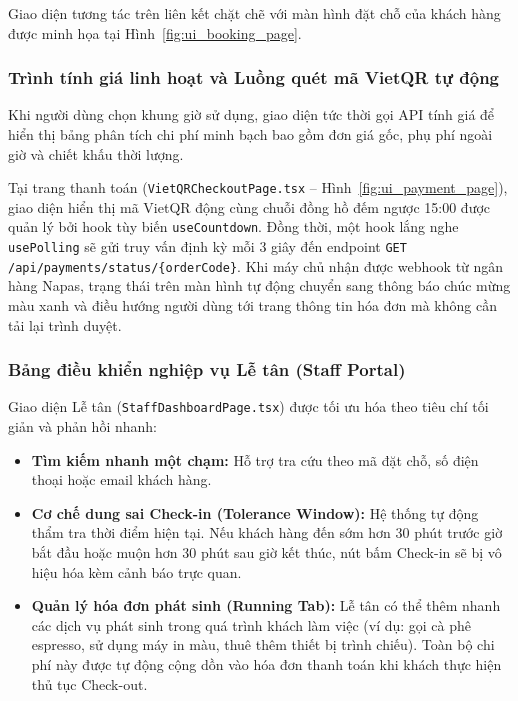 Giao diện tương tác trên liên kết chặt chẽ với màn hình đặt chỗ của khách hàng được minh họa tại Hình~\ref{fig:ui_booking_page}.

\subsubsection{Trình tính giá linh hoạt và Luồng quét mã VietQR tự động}

Khi người dùng chọn khung giờ sử dụng, giao diện tức thời gọi API tính giá để hiển thị bảng phân tích chi phí minh bạch bao gồm đơn giá gốc, phụ phí ngoài giờ và chiết khấu thời lượng. 

Tại trang thanh toán (\texttt{VietQRCheckoutPage.tsx} -- Hình~\ref{fig:ui_payment_page}), giao diện hiển thị mã VietQR động cùng chuỗi đồng hồ đếm ngược 15:00 được quản lý bởi hook tùy biến \texttt{useCountdown}. Đồng thời, một hook lắng nghe \texttt{usePolling} sẽ gửi truy vấn định kỳ mỗi 3 giây đến endpoint \texttt{GET /api/payments/status/\{orderCode\}}. Khi máy chủ nhận được webhook từ ngân hàng Napas, trạng thái trên màn hình tự động chuyển sang thông báo chúc mừng màu xanh và điều hướng người dùng tới trang thông tin hóa đơn mà không cần tải lại trình duyệt.

\subsubsection{Bảng điều khiển nghiệp vụ Lễ tân (Staff Portal)}

Giao diện Lễ tân (\texttt{StaffDashboardPage.tsx}) được tối ưu hóa theo tiêu chí tối giản và phản hồi nhanh:
\begin{itemize}
    \item \textbf{Tìm kiếm nhanh một chạm:} Hỗ trợ tra cứu theo mã đặt chỗ, số điện thoại hoặc email khách hàng.
    \item \textbf{Cơ chế dung sai Check-in (Tolerance Window):} Hệ thống tự động thẩm tra thời điểm hiện tại. Nếu khách hàng đến sớm hơn 30 phút trước giờ bắt đầu hoặc muộn hơn 30 phút sau giờ kết thúc, nút bấm Check-in sẽ bị vô hiệu hóa kèm cảnh báo trực quan.
    \item \textbf{Quản lý hóa đơn phát sinh (Running Tab):} Lễ tân có thể thêm nhanh các dịch vụ phát sinh trong quá trình khách làm việc (ví dụ: gọi cà phê espresso, sử dụng máy in màu, thuê thêm thiết bị trình chiếu). Toàn bộ chi phí này được tự động cộng dồn vào hóa đơn thanh toán khi khách thực hiện thủ tục Check-out.
\end{itemize}

